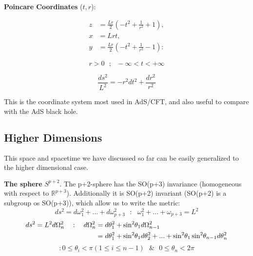 \documentclass[12pt]{article}
\begin{document}
\vspace{.5cm}

\textbf{Poincare Coordinates} (\( t,r \)):

\begin{equation}
    \begin{aligned}
        z &= \frac{Lr}{2}\left(-t^2 + \frac{1}{r^2} + 1 \right), \\
        x &= Lrt, \\
        y &= \frac{Lr}{2}\left(-t^2 + \frac{1}{r^2} - 1 \right):
    \end{aligned}
\end{equation}

\[ r > 0 ~~~ ; ~~~ -\infty < t < +\infty \]

\begin{equation}
    \frac{ds^2}{L^2} = -r^2 dt^2 + \frac{dr^2}{r^2}
\end{equation}

This is the coordinate system most used in AdS/CFT, and also useful to compare with the AdS black hole.

\newpage

\subsection{Higher Dimensions}

This space and spacetime we have discussed so far can be easily generalized to the higher dimensional case.

\vspace{.5cm}

\textbf{The sphere} \( S^{p+2} \). The p+2-sphere has the SO(p+3) invariance (homogeneous with respect to \( \mathbb{R}^{p+3} \)). Additionally it is SO(p+2) invariant (SO(p+2) is a subgroup os SO(p+3)), which allow us to write the metric:
\begin{equation}
ds^2 = d\omega_1^2 + ... + d\omega_{p+3}^2 ~~~:~~~ \omega_1^2 + ... + \omega_{p+3} = L^2
\end{equation}
\begin{equation}
    \begin{aligned}
        ds^2 = L^2d\Omega_n^2 ~~~:~~~ d\Omega_n^2 &= d\theta_1^2 + \sin^2{ \hspace{-2pt} \theta_1} d\Omega_{n-1}^2 \\
                                                &= d\theta_1^2 + \sin^2{ \hspace{-2pt} \theta_1} d\theta_2^2 + ... + \sin^2{ \hspace{-2pt}\theta_1 }\sin^2{ \hspace{-2pt}\theta_{n-1} } d\theta_n^2  
    \end{aligned}
\end{equation}
\begin{equation*}
    : 0 \leq \theta_i < \pi (1 \leq i \leq n-1) ~~~\&~~~ 0 \leq \theta_n < 2\pi
\end{equation*}
\end{document}
